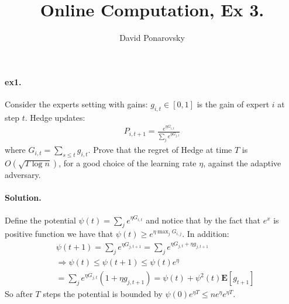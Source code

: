 \documentclass{article}
\newcommand{\expp}[1]{ \mathbf{E} \left[ {#1} \right]}
\begin{document}
\newcommand{\dalg}[1]{\expp{#1 : \text{alg} \sim \tilde{\text{alg}}}}
\newcommand{\dsig}[1]{\expp{#1 : \sigma \sim \tilde{\sigma}}}
\newcommand{\calg}{c_{\text{alg}}}
\newcommand{\cbase}{c_{\text{base}}}


\title{Online Computation, Ex 3.} 
\author{David Ponarovsky}
\maketitle

\begin{multicols*}{2}
  \paragraph{ex1.} Consider the experts setting with gains: $g_{i,t} \in \left[ 0,1 \right]$ is the gain of expert $i$ at step $t$. Hedge updates:  
  \begin{equation*}
    \begin{split}
      P_{i,t+1}= \frac{e^{\eta G_{i,t}}}{\sum_{j}{ e^{\eta G_{j,t}}} }
    \end{split}
  \end{equation*} where $G_{i,t} = \sum_{s\le t}{g_{i,t}} $. Prove that the regret of Hedge at time $T$ is $O\left( \sqrt{T\log n} \right)$, for a good choice of the learning rate $\eta$, against the adaptive adversary.  
  \paragraph{Solution.} Define the potential $\psi\left( t \right) =  \sum_{j}{ e^{\eta G_{i,t}}}$ and notice that by the fact that $e^{x}$ is positive function we have that $\psi\left( t \right) \ge e^{\eta \max_j G_{i,j}}$. In addition: 
  \begin{equation*}
    \begin{split}
      & \psi\left( t + 1 \right) =  \sum_{j}{ e^{\eta G_{j,t+1}}} =\sum_{j}{ e^{\eta G_{j,t} + \eta g_{j,t+1}}}  \\
      & \Rightarrow   \psi\left( t \right) \le \psi\left( t + 1 \right)\le \psi\left( t \right)e^{\eta} \\ 
      &  =\sum_{j}{ e^{\eta G_{j,t}  }\left(  1 + \eta g_{j,t+1} \right) }= \psi\left( t \right)  +   \psi^{2}\left( t \right) \expp{g_{t+1}}  
    \end{split}
  \end{equation*}
  So after $T$ steps the potential is bounded by $\psi\left( 0 \right)e^{\eta T} \le ne^{\eta}e^{\eta T}$.

\end{multicols*}
\end{document}
